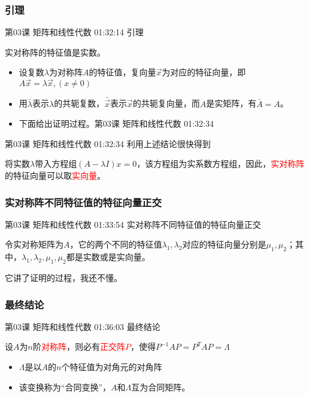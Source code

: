 \documentclass[UTF8]{ctexbook}
\begin{document}
\subsubsection{引理}

第03课 矩阵和线性代数 01:32:14 引理

实对称阵的特征值是实数。

\begin{itemize}
\item 设复数$\lambda$为对称阵$A$的特征值，复向量$\vec{x}$为对应的特征向量，即$A\vec{x}=\lambda \vec{x},(x \neq 0)$
\item 用$\bar{\lambda}$表示$\lambda$的共轭复数，$\bar{\vec{x}}$表示$\vec{x}$的共轭复向量，而$A$是实矩阵，有$\bar{A}=A$。
\item 下面给出证明过程。第03课 矩阵和线性代数 01:32:34
\end{itemize}

第03课 矩阵和线性代数 01:32:34 利用上述结论很快得到

将实数$\lambda$带入方程组$(A-\lambda I)x=0$，该方程组为实系数方程组，因此，\textcolor{red}{实对称阵}的特征向量可以取\textcolor{red}{实向量}。

\subsubsection{实对称阵不同特征值的特征向量正交}

第03课 矩阵和线性代数 01:33:54 实对称阵不同特征值的特征向量正交

令实对称矩阵为$A$，它的两个不同的特征值$\lambda_{1},\lambda_{2}$对应的特征向量分别是$\mu_{1},\mu_{2}$；其中，$\lambda_{1},\lambda_{2},\mu_ {1},\mu_{2}$都是实数或是实向量。

它讲了证明的过程，我还不懂。

\subsubsection{最终结论}

第03课 矩阵和线性代数 01:36:03 最终结论

设$A$为$n$阶\textcolor{red}{对称阵}，则必有\textcolor{red}{正交阵$P$}，使得$P^{-1}AP=P^{T}AP=\Lambda$

\begin{itemize}
\item $\Lambda$是以$A$的$n$个特征值为对角元的对角阵
\item 该变换称为“合同变换”，$A$和$\Lambda$互为合同矩阵。
\end{itemize}
\end{document}
